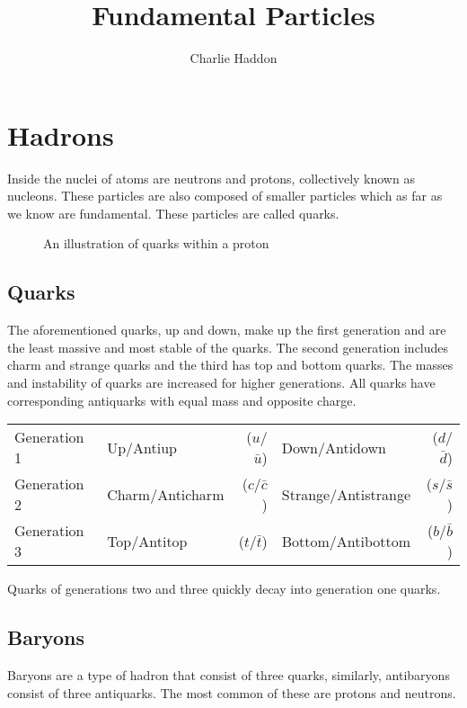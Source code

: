 \documentclass[a4,8pt]{article}
\title{Fundamental Particles}
\author{Charlie Haddon}
\begin{document}
\section{Hadrons}
Inside the nuclei of atoms are neutrons and protons, collectively known as nucleons. These 
particles are also composed of smaller particles which as far as we know are fundamental. 
These particles are called quarks.

\begin{figure}[H]
\begin{center}
\caption{An illustration of quarks within a proton}
\end{center}
\end{figure}

\subsection{Quarks}
The aforementioned quarks, up and down, make up the first generation and are the least massive 
and most stable of the quarks. The second generation includes charm and strange quarks and
the third has top and bottom quarks. The masses and instability of quarks are increased for
higher generations. All quarks have corresponding antiquarks with equal mass and opposite 
charge.

\begin{center}
\begin{tabular}[H]{l|l r l r}
Generation 1 & Up/Antiup       & ($u$/$\bar{u}$) & Down/Antidown        & ($d$/$\bar{d}$)\\
Generation 2 & Charm/Anticharm & ($c$/$\bar{c}$) & Strange/Antistrange  & ($s$/$\bar{s}$)\\
Generation 3 & Top/Antitop     & ($t$/$\bar{t}$) & Bottom/Antibottom    & ($b$/$\bar{b}$)\\
\end{tabular}
\end{center}

Quarks of generations two and three quickly decay into generation one quarks.

\subsection{Baryons}
Baryons are a type of hadron that consist of three quarks, similarly, antibaryons consist of
three antiquarks. The most common of these are protons and neutrons. 
\end{document}
